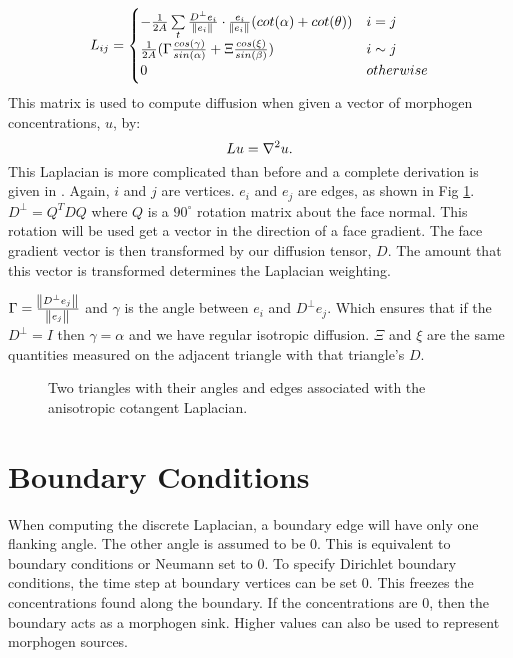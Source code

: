 \[ 
   L_{ij} =
   \begin{cases} 
      -\frac{1}{2A}\sum\limits_{t} \frac{D^\perp e_i}{\norm{e_i}} \cdot \frac{e_i}{\norm{e_i}}(cot(\alpha)+cot(\theta))  & i = j \\
      \frac{1}{2A}(\Gamma \frac{cos(\gamma)}{sin(\alpha)} + \Xi\frac{cos(\xi)}{sin(\beta)})   & i \sim j \\
      0 & otherwise
   \end{cases}
\]
This matrix is used to compute diffusion when given a vector of morphogen concentrations, $u$, by:
\[
	Lu = \nabla^2 u.
\]
This Laplacian is more complicated than before and a complete derivation is given in \cite{AndreuxMathieu2014}. Again, $i$ and $j$ are vertices. $e_i$ and $e_j$ are edges, as shown in Fig \ref{fig:meshLaplacian}. $D^\perp = Q^T D Q$ where $Q$ is a $90^\circ$ rotation matrix about the face normal. This rotation will be used get a vector in the direction of a face gradient. The face gradient vector is then transformed by our diffusion tensor, $D$. The amount that this vector is transformed determines the Laplacian weighting. 

$\Gamma = \frac{\norm{D^\perp e_j}}{\norm{e_j}}$ and $\gamma$ is the angle between $e_i$ and $D^\perp e_j$. Which ensures that if the $D^{\perp} = I$ then $\gamma = \alpha$ and we have regular isotropic diffusion. $\Xi$ and $\xi$ are the same quantities measured on the adjacent triangle with that triangle's $D$. 

\begin{figure}[H]
	\centering
	\caption{Two triangles with their angles and edges associated with the anisotropic cotangent Laplacian.}
	\label{fig:meshLaplacian}
\end{figure}

\section{Boundary Conditions}
When computing the discrete Laplacian, a boundary edge will have only one flanking angle. The other angle is assumed to be 0. This is equivalent to  boundary conditions or Neumann set to 0. To specify Dirichlet boundary conditions, the time step at boundary vertices can be set 0. This freezes the concentrations found along the boundary. If the concentrations are 0, then the boundary acts as a morphogen sink. Higher values can also be used to represent morphogen sources.

